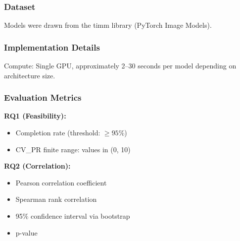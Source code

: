 
\subsubsection{Dataset}

Models were drawn from the timm library (PyTorch Image Models).

\begin{table}[htbp]
\centering
{}
\end{table}

\subsubsection{Implementation Details}

\begin{table}[htbp]
\centering
{}
\end{table}

Compute: Single GPU, approximately 2--30 seconds per model depending on architecture size.

\subsubsection{Evaluation Metrics}

\textbf{RQ1 (Feasibility):}
\begin{itemize}
\item Completion rate (threshold: $\geq 95$\%)
\item CV\_PR finite range: values in (0, 10)
\end{itemize}

\textbf{RQ2 (Correlation):}
\begin{itemize}
\item Pearson correlation coefficient
\item Spearman rank correlation
\item 95\% confidence interval via bootstrap
\item p-value
\end{itemize}
